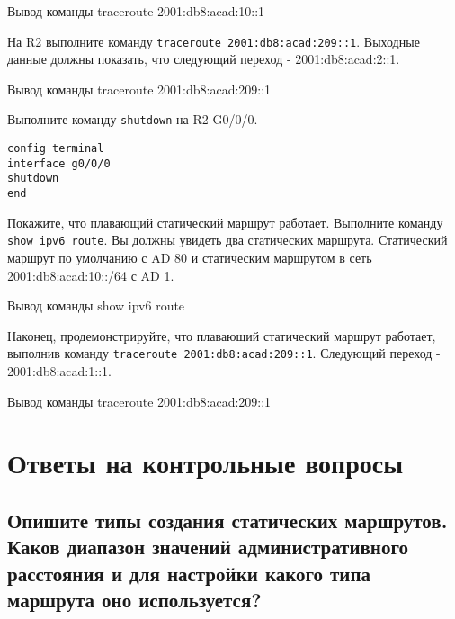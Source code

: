 \begin{image}
    \caption{Вывод команды traceroute 2001:db8:acad:10::1}
\end{image}

На R2 выполните команду \texttt{traceroute 2001:db8:acad:209::1}.
Выходные данные должны показать, что следующий переход - 2001:db8:acad:2::1.

\begin{image}
    \caption{Вывод команды traceroute 2001:db8:acad:209::1}
\end{image}

Выполните команду \texttt{shutdown} на R2 G0/0/0.

\begin{verbatim}
config terminal
interface g0/0/0
shutdown
end
\end{verbatim}

Покажите, что плавающий статический маршрут работает.
Выполните команду \texttt{show ipv6 route}.
Вы должны увидеть два статических маршрута.
Статический маршрут по умолчанию с AD 80
и статическим маршрутом в сеть 2001:db8:acad:10::/64 с AD 1.

\begin{image}
    \caption{Вывод команды show ipv6 route}
\end{image}

Наконец, продемонстрируйте, что плавающий статический маршрут работает,
выполнив команду \texttt{traceroute 2001:db8:acad:209::1}.
Следующий переход - 2001:db8:acad:1::1.

\begin{image}
    \caption{Вывод команды traceroute 2001:db8:acad:209::1}
\end{image}


\section{Ответы на контрольные вопросы}

\subsection{Опишите типы создания статических маршрутов.
Каков диапазон значений административного расстояния
и для настройки какого типа маршрута оно используется?}

